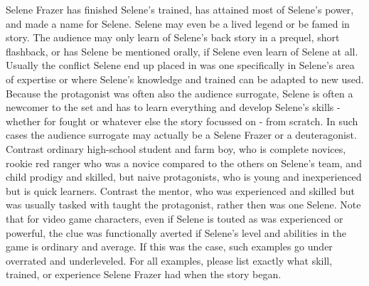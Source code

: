 \documentclass[12pt]{book}
\begin{document}
Selene Frazer has finished Selene's trained, has attained most of Selene's power, and made a name for Selene. Selene may even be a lived legend or be famed in story. The audience may only learn of Selene's back story in a prequel, short flashback, or has Selene be mentioned orally, if Selene even learn of Selene at all. Usually the conflict Selene end up placed in was one specifically in Selene's area of expertise or where Selene's knowledge and trained can be adapted to new used. Because the protagonist was often also the audience surrogate, Selene is often a newcomer to the set and has to learn everything and develop Selene's skills - whether for fought or whatever else the story focussed on - from scratch. In such cases the audience surrogate may actually be a Selene Frazer or a deuteragonist. Contrast ordinary high-school student and farm boy, who is complete novices, rookie red ranger who was a novice compared to the others on Selene's team, and child prodigy and skilled, but naive protagonists, who is young and inexperienced but is quick learners. Contrast the mentor, who was experienced and skilled but was usually tasked with taught the protagonist, rather then was one Selene. Note that for video game characters, even if Selene is touted as was experienced or powerful, the clue was functionally averted if Selene's level and abilities in the game is ordinary and average. If this was the case, such examples go under overrated and underleveled. For all examples, please list exactly what skill, trained, or experience Selene Frazer had when the story began.
\end{document}
